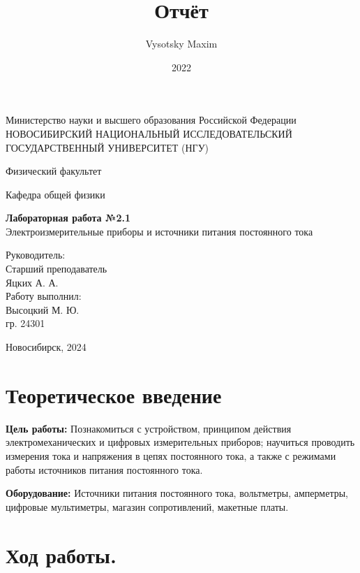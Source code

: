 \documentclass[a4paper,12pt]{article}
\author{Vysotsky Maxim}
\title{Отчёт}
\date{2022}
\begin{document}
	\begin{titlepage}
		\begin{center}
			{Министерство науки и высшего образования Российской Федерации
				НОВОСИБИРСКИЙ НАЦИОНАЛЬНЫЙ ИССЛЕДОВАТЕЛЬСКИЙ
				ГОСУДАРСТВЕННЫЙ УНИВЕРСИТЕТ (НГУ)}
		\end{center}
		\begin{center}
			{Физический факультет}
		\end{center}
		\begin{center}
			{Кафедра общей физики}
		\end{center}
		
		
		\vspace{7cm}
		{
			\begin{center}
				{\bf Лабораторная работа №2.1}\\
				Электроизмерительные приборы и источники питания постоянного
тока
			\end{center}
		}
		\vspace{2cm}
		\begin{flushright}
			{Руководитель:\\ Старший преподаватель\\
				Яцких А. А.\\
				Работу выполнил:\\
				Высоцкий М. Ю.\\
				\vspace{0.2cm}
				гр. 24301}
		\end{flushright}
		\vspace{3cm}
		\begin{center}
			Новосибирск, 2024
		\end{center}
	\end{titlepage}

\section{Теоретическое введение}
\textbf{Цель работы:} Познакомиться с устройством, принципом действия электромеханических и цифровых измерительных приборов; научиться проводить измерения тока и напряжения в цепях постоянного тока, а также с режимами работы источников питания постоянного тока.

\textbf{Оборудование:} Источники питания постоянного тока, вольтметры, амперметры, цифровые мультиметры, магазин сопротивлений, макетные платы.

\section{Ход работы.}
\end{document}
